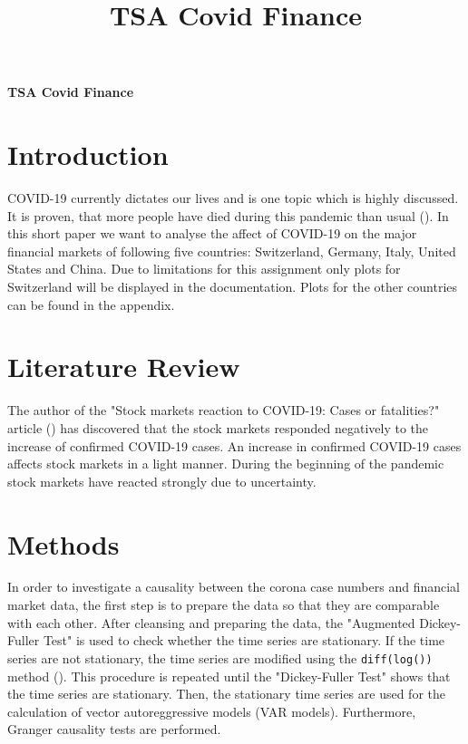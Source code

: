 \documentclass[11pt]{article}
\title{TSA Covid Finance}
\begin{document}
\begin{center}
\textbf{\Large TSA Covid Finance}    
\end{center}


\section{Introduction}
COVID-19 currently dictates our lives and is one topic which is highly discussed. It is proven, that more people have died during this pandemic than usual (\cite{owidcoronavirus}). In this short paper we want to analyse the affect of COVID-19 on the major financial markets of following five countries: Switzerland, Germany, Italy, United States and China. Due to limitations for this assignment only plots for Switzerland will be displayed in the documentation. Plots for the other countries can be found in the appendix.

\section{Literature Review}
The author of the "Stock markets reaction to COVID-19: Cases or fatalities?" article (\cite{stock-covid-reaction}) has discovered that the stock markets responded negatively to the increase of confirmed COVID-19 cases. An increase in confirmed COVID-19 cases affects stock markets in a light manner. During the beginning of the pandemic stock markets have reacted strongly due to uncertainty.



\section{Methods}
In order to investigate a causality between the corona case numbers and financial market data, the first step is to prepare the data so that they are comparable with each other. After cleansing and preparing the data, the "Augmented Dickey-Fuller Test" is used to check whether the time series are stationary. If the time series are not stationary, the time series are modified using the \lstinline{diff(log())} method (). This procedure is repeated until the "Dickey-Fuller Test" shows that the time series are stationary. Then, the stationary time series are used for the calculation of vector autoreggressive models (VAR models). Furthermore, Granger causality tests are performed.
\end{document}
